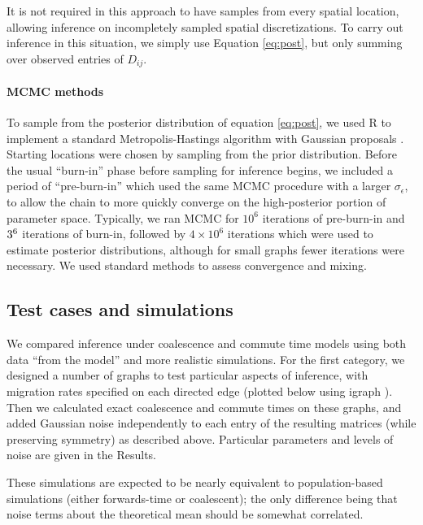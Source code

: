 \documentclass{article}
\begin{document}
It is not required in this approach to have samples from every spatial location,
allowing inference on incompletely sampled spatial discretizations.
To carry out inference in this situation,
we simply use Equation \ref{eq:post},
but only summing over observed entries of $D_{ij}$.

\paragraph{MCMC methods}
To sample from the posterior distribution of equation \eqref{eq:post}, 
we used R \citep{R} 
to implement a standard Metropolis-Hastings algorithm with Gaussian proposals \citep{brooks2011handbook}.
Starting locations were chosen by sampling from the prior distribution.
Before the usual ``burn-in'' phase before sampling for inference begins,
we included a period of ``pre-burn-in'' which used the same MCMC procedure
with a larger $\sigma_\epsilon$, to allow the chain to more quickly converge on the high-posterior
portion of parameter space.
Typically, we ran MCMC for $10^6$ iterations of pre-burn-in 
and $3 \time 10^6$ iterations of burn-in,
followed by $4 \times 10^6$ iterations which were used to estimate posterior distributions,
although for small graphs fewer iterations were necessary.
We used standard methods to assess convergence and mixing.


\subsection*{Test cases and simulations}

We compared inference under coalescence and commute time models
using both data ``from the model'' and more realistic simulations.
For the first category, we designed a number of graphs to test particular aspects of inference,
with migration rates specified on each directed edge
(plotted below using igraph \citep{igraph}).
Then we calculated exact coalescence and commute times on these graphs,
and added Gaussian noise independently to each entry of the resulting matrices
(while preserving symmetry)
as described above.
Particular parameters and levels of noise are given in the Results.

These simulations are expected to be nearly equivalent to population-based simulations
(either forwards-time or coalescent);
the only difference being that noise terms about the theoretical mean should be somewhat correlated.
\end{document}
